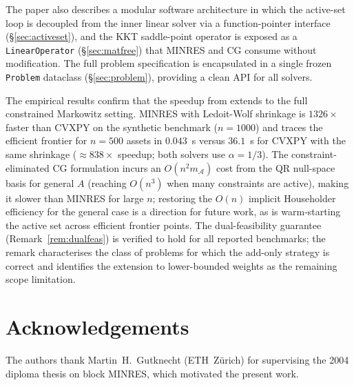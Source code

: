 \documentclass{siam/siamart}
\begin{document}
The paper also describes a modular software architecture in which the
active-set loop is decoupled from the inner linear solver via a function-pointer
interface (\S\ref{sec:activeset}), and the KKT saddle-point operator is exposed as a
\texttt{LinearOperator} (\S\ref{sec:matfree}) that MINRES and CG consume without modification.
The full problem specification is encapsulated in a single frozen \texttt{Problem}
dataclass (\S\ref{sec:problem}), providing a clean API for all solvers.

The empirical results confirm that the speedup from \cite{minvar_paper} extends
to the full constrained Markowitz setting.  MINRES with Ledoit-Wolf shrinkage is
$1326\times$ faster than CVXPY on the synthetic benchmark ($n=1000$) and traces
the efficient frontier for $n=500$ assets in $0.043$~s versus $36.1$~s for
CVXPY with the same shrinkage (${\approx}838\times$ speedup; both solvers use
$\alpha=1/3$).  The
constraint-eliminated CG formulation \cite{hestenes1952} incurs an $O(n^2 m_\mathcal{A})$
cost from the QR null-space basis for general $A$ (reaching $O(n^3)$ when many
constraints are active), making it slower than MINRES for large $n$; restoring the
$O(n)$ implicit Householder efficiency for the general case is a direction for future
work, as is warm-starting the active set across efficient frontier points.  The dual-feasibility guarantee (Remark~\ref{rem:dualfeas}) is verified to hold for
all reported benchmarks; the remark characterises the class of problems for which
the add-only strategy is correct and identifies the extension to lower-bounded
weights as the remaining scope limitation.

\section*{Acknowledgements}

The authors thank Martin~H.~Gutknecht (ETH~Z\"{u}rich) for supervising the 2004 diploma
thesis \cite{schmelzer2004} on block MINRES, which motivated the present work.



\end{document}
